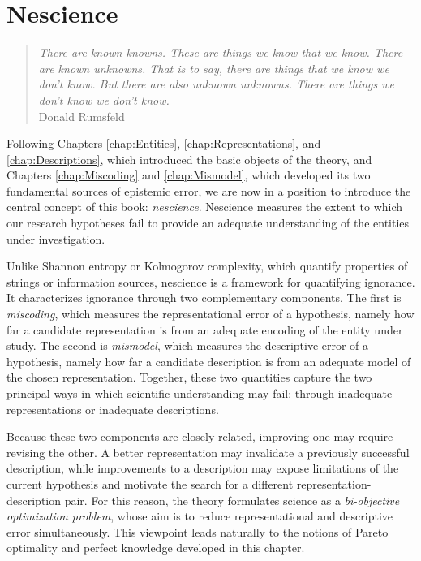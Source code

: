 %
%


\chapter{Nescience}
\label{chap:Nescience}

\begin{quote}
\begin{flushright}
\emph{There are known knowns. These are things we know that we know.
There are known unknowns. That is to say, there are things that we know we don't know.
But there are also unknown unknowns. There are things we don't know we don't know.} \\
Donald Rumsfeld
\end{flushright}
\end{quote}
\bigskip

Following Chapters \ref{chap:Entities}, \ref{chap:Representations}, and \ref{chap:Descriptions}, which introduced the basic objects of the theory, and Chapters \ref{chap:Miscoding} and \ref{chap:Mismodel}, which developed its two fundamental sources of epistemic error, we are now in a position to introduce the central concept of this book: \emph{nescience}. Nescience measures the extent to which our research hypotheses fail to provide an adequate understanding of the entities under investigation.

Unlike Shannon entropy or Kolmogorov complexity, which quantify properties of strings or information sources, nescience is a framework for quantifying ignorance. It characterizes ignorance through two complementary components. The first is \emph{miscoding}, which measures the representational error of a hypothesis, namely how far a candidate representation is from an adequate encoding of the entity under study. The second is \emph{mismodel}, which measures the descriptive error of a hypothesis, namely how far a candidate description is from an adequate model of the chosen representation. Together, these two quantities capture the two principal ways in which scientific understanding may fail: through inadequate representations or inadequate descriptions.

Because these two components are closely related, improving one may require revising the other. A better representation may invalidate a previously successful description, while improvements to a description may expose limitations of the current hypothesis and motivate the search for a different representation-description pair. For this reason, the theory formulates science as a \emph{bi-objective optimization problem}, whose aim is to reduce representational and descriptive error simultaneously. This viewpoint leads naturally to the notions of Pareto optimality and perfect knowledge developed in this chapter.

